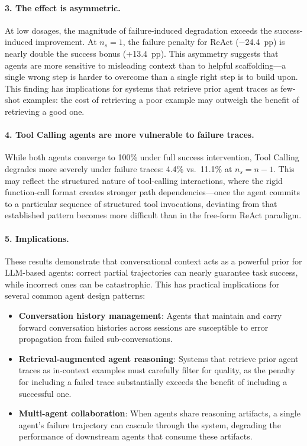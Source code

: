\paragraph{3. The effect is asymmetric.}
At low dosages, the magnitude of failure-induced degradation exceeds the success-induced improvement.
At $n_s{=}1$, the failure penalty for ReAct ($-$24.4~pp) is nearly double the success bonus (+13.4~pp).
This asymmetry suggests that agents are more sensitive to misleading context than to helpful scaffolding---a single wrong step is harder to overcome than a single right step is to build upon.
This finding has implications for systems that retrieve prior agent traces as few-shot examples: the cost of retrieving a poor example may outweigh the benefit of retrieving a good one.

\paragraph{4. Tool Calling agents are more vulnerable to failure traces.}
While both agents converge to 100\% under full success intervention, Tool Calling degrades more severely under failure traces: 4.4\% vs.\ 11.1\% at $n_s{=}n{-}1$.
This may reflect the structured nature of tool-calling interactions, where the rigid function-call format creates stronger path dependencies---once the agent commits to a particular sequence of structured tool invocations, deviating from that established pattern becomes more difficult than in the free-form ReAct paradigm.

\paragraph{5. Implications.}
These results demonstrate that conversational context acts as a powerful prior for LLM-based agents: correct partial trajectories can nearly guarantee task success, while incorrect ones can be catastrophic.
This has practical implications for several common agent design patterns:
\begin{itemize}
    \item \textbf{Conversation history management}: Agents that maintain and carry forward conversation histories across sessions are susceptible to error propagation from failed sub-conversations.
    \item \textbf{Retrieval-augmented agent reasoning}: Systems that retrieve prior agent traces as in-context examples must carefully filter for quality, as the penalty for including a failed trace substantially exceeds the benefit of including a successful one.
    \item \textbf{Multi-agent collaboration}: When agents share reasoning artifacts, a single agent's failure trajectory can cascade through the system, degrading the performance of downstream agents that consume these artifacts.
\end{itemize}
